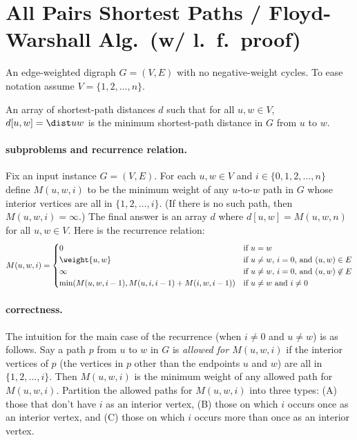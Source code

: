 
\section{All Pairs Shortest Paths / Floyd-Warshall Alg.~(w/ l.~f.~proof)}\label{dp: sec: FW}

\begin{mylist}
\item[\bf input:]
  An edge-weighted digraph $G=(V,E)$ with no negative-weight cycles.
  To ease notation assume $V=\{1,2,\ldots,n\}$.
  
\item[\bf output:]
  An array of shortest-path distances $d$
  such that for all $u, w\in V$,
  $d[u, w] = \dist u w$ is the minimum shortest-path distance in $G$ from $u$ to $w$.
\end{mylist}


\paragraph{subproblems and recurrence relation.}
Fix an input instance $G=(V,E)$. 
For each $u, w\in V$ and $i\in\{0, 1,2,\ldots,n\}$
define $M(u, w, i)$
to be the minimum weight of any $u$-to-$w$ path in $G$
whose interior vertices are all in $\{1,2,\ldots,i\}$.
(If there is no such path, then $M(u, w, i) = \infty$.)
The final answer is an array $d$
where $d[u,w] = M(u, w, n)$ for all $u,w\in V$.
Here is the recurrence relation:
\[M(u,w,i) =
  \begin{cases}
    0 & \text{if } u=w \\
    \weight {u, w} & \text{if $u\ne w$, $i=0$, and $(u, w)\in E$} \\
    \infty & \text{if $u\ne w$, $i=0$, and $(u, w)\not\in E$} \\
    \min( M(u, w, i-1), M(u, i, i-1) + M(i, w, i-1) ) & \text{if $u\ne w$ and $i\ne 0$}
  \end{cases}
  \]
  
\paragraph{correctness.}
The intuition for the main case of the recurrence (when $i\ne 0$ and $u\ne w$)
is as follows.
Say a path $p$ from $u$ to $w$ in $G$ is \emph{allowed for $M(u, w, i)$}
if the interior vertices of $p$ (the vertices in $p$ other than the endpoints $u$ and $w$)
are all in $\{1,2,\ldots, i\}$.
Then $M(u, w, i)$ is the minimum weight of any allowed path for $M(u, w, i)$.
Partition the allowed paths for $M(u, w, i)$ into three types:
(A) those that don't have $i$ as an interior vertex,
(B) those on which $i$ occurs once as an interior vertex,
and (C) those on which $i$ occurs more than once as an interior vertex.

